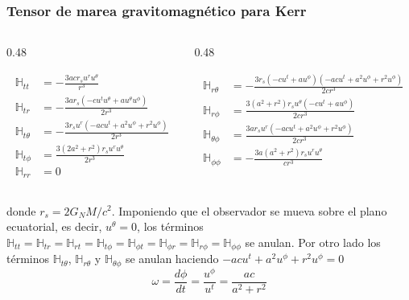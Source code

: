 \documentclass[aspectratio=169,10pt,usenames,dvipsnames,spanish]{beamer}
\begin{document}
\begin{frame}
\frametitle{Tensor de marea gravitomagnético para Kerr}
\begin{columns}

\begin{column}{0.48\textwidth}

\begin{align*}
\mathbb{H}_{tt}&=-\frac{3acr_su^ru^{\theta}}{r^3}\\
\mathbb{H}_{tr}&=-\frac{3ar_s(-cu^tu^{\theta}+au^{\theta}u^{\phi})}{2r^3}\\
\mathbb{H}_{t\theta}&=-\frac{3r_su^r(-acu^t+a^2u^{\phi}+r^2u^{\phi})}{2r^3}\\
\mathbb{H}_{t\phi}&=\frac{3(2a^2+r^2)r_s u^r u^{\theta}}{2r^3}\\
\mathbb{H}_{rr}&=0
\end{align*}

\end{column}

\begin{column}{0.48\textwidth}

\begin{align*}
\mathbb{H}_{r\theta}&=-\frac{3r_s(-cu^t+au^{\phi})(-acu^t+a^2u^{\phi}+r^2u^{\phi})}{2cr^3}\\
\mathbb{H}_{r\phi}&=\frac{3(a^2+r^2)r_su^{\theta}(-cu^t+au^{\phi})}{2cr^3}\\
\mathbb{H}_{\theta\phi}&=\frac{3ar_s u^r(-acu^t+a^2u^{\phi}+r^2u^{\phi})}{2cr^3}\\
\mathbb{H}_{\phi\phi}&=-\frac{3a(a^2+r^2)r_s u^r u^{\theta}}{cr^3}
\end{align*}

\end{column}

\end{columns}

donde $r_s=2G_N M/c^2$. Imponiendo que el observador se mueva sobre el plano ecuatorial, es decir, $u^{\theta}=0$, los términos $\mathbb{H}_{tt}=\mathbb{H}_{tr}=\mathbb{H}_{rt}=\mathbb{H}_{t\phi}=\mathbb{H}_{\phi t}=\mathbb{H}_{\phi r}=\mathbb{H}_{r \phi}=\mathbb{H}_{\phi\phi}$ se anulan. Por otro lado los términos $\mathbb{H}_{t\theta}$, $\mathbb{H}_{r\theta}$ y $\mathbb{H}_{\theta\phi}$ se anulan haciendo $-acu^t+a^2u^{\phi}+r^2u^{\phi}=0$
\begin{equation}\label{CondicionHnulaKerr}
\omega=\frac{d\phi}{dt}=\frac{u^{\phi}}{u^{t}}=\frac{ac}{a^2+r^2}
\end{equation}

\end{frame}
\end{document}
